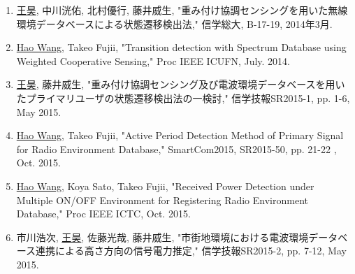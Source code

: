 \begin{publication}
  \begin{enumerate}[{}i{.}]
  \item \underline{王昊}, 中川洸佑, 北村優行, 藤井威生, "重み付け協調センシングを用いた無線環境データベースによる状態遷移検出法," 信学総大, B-17-19, 2014年3月.
  \item \underline{Hao Wang}, Takeo Fujii, "Transition detection with Spectrum Database using Weighted Cooperative Sensing," Proc IEEE ICUFN, July. 2014.
  \item \underline{王昊}, 藤井威生, "重み付け協調センシング及び電波環境データベースを用いたプライマリユーザの状態遷移検出法の一検討," 信学技報SR2015-1, pp. 1-6, May 2015.
  \item \underline{Hao Wang}, Takeo Fujii, "Active Period Detection Method of Primary Signal for Radio Environment Database," SmartCom2015, SR2015-50, pp. 21-22 , Oct. 2015.
  \item \underline{Hao Wang}, Koya Sato, Takeo Fujii, "Received Power Detection under Multiple ON/OFF Environment for Registering Radio Environment Database," Proc IEEE ICTC, Oct. 2015.
  \item 市川浩次, \underline{王昊}, 佐藤光哉, 藤井威生, "市街地環境における電波環境データベース連携による高さ方向の信号電力推定," 信学技報SR2015-2, pp. 7-12, May 2015.
   \end{enumerate}
\end{publication}

